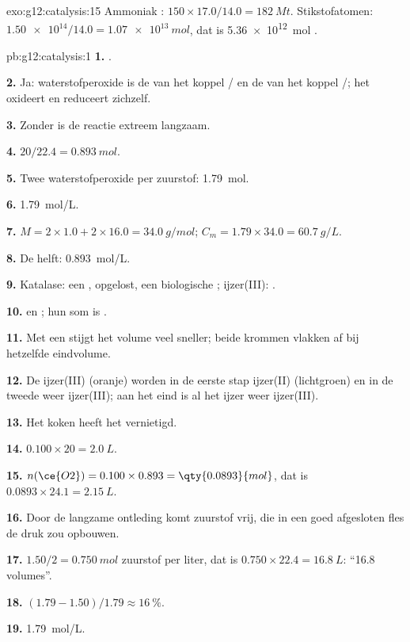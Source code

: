 \begin{solution}{exo:g12:catalysis:15}
Ammoniak : $150 \times 17.0 / 14.0 = \qty{182}{Mt}$.
Stikstofatomen: $\num{1.50e14} / 14.0 = \qty{1.07e13}{mol}$, dat is
\qty{5.36e12}{mol} .
\end{solution}

\begin{solution}{pb:g12:catalysis:1}
\textbf{1.} .

\textbf{2.} Ja: waterstofperoxide is de  van het koppel
/ en de  van het koppel /; het
oxideert en reduceert zichzelf.

\textbf{3.} Zonder  is de reactie extreem langzaam.

\textbf{4.} $20 / 22.4 = \qty{0.893}{mol}$.

\textbf{5.} Twee  waterstofperoxide per  zuurstof:
\qty{1.79}{mol}.

\textbf{6.} \qty{1.79}{mol/L}.

\textbf{7.} $M = 2 \times 1.0 + 2 \times 16.0 = \qty{34.0}{g/mol}$;
$C_m = 1.79 \times 34.0 = \qty{60.7}{g/L}$.

\textbf{8.} De helft: \qty{0.893}{mol/L}.

\textbf{9.} Katalase: een , opgelost, een biologische ;
ijzer(III): .

\textbf{10.}  en
; hun som is
.

\textbf{11.} Met een  stijgt het volume veel sneller; beide
krommen vlakken af bij hetzelfde eindvolume.

\textbf{12.} De ijzer(III) (oranje) worden in de eerste stap
ijzer(II) (lichtgroen) en in de tweede weer ijzer(III); aan het eind is
al het ijzer weer ijzer(III).

\textbf{13.} Het koken heeft het  vernietigd.

\textbf{14.} $0.100 \times 20 = \qty{2.0}{L}$.

\textbf{15.} $n(\ce{O2}) = 0.100 \times 0.893 = \qty{0.0893}{mol}$, dat
is $0.0893 \times 24.1 = \qty{2.15}{L}$.

\textbf{16.} Door de langzame ontleding komt zuurstof vrij, die in een
goed afgesloten fles de druk zou opbouwen.

\textbf{17.} $1.50 / 2 = \qty{0.750}{mol}$ zuurstof per liter, dat is
$0.750 \times 22.4 = \qty{16.8}{L}$: ``16.8 volumes''.

\textbf{18.} $(1.79 - 1.50)/1.79 \approx \qty{16}{\percent}$.

\textbf{19.} \qty{1.79}{mol/L}.
\end{solution}
